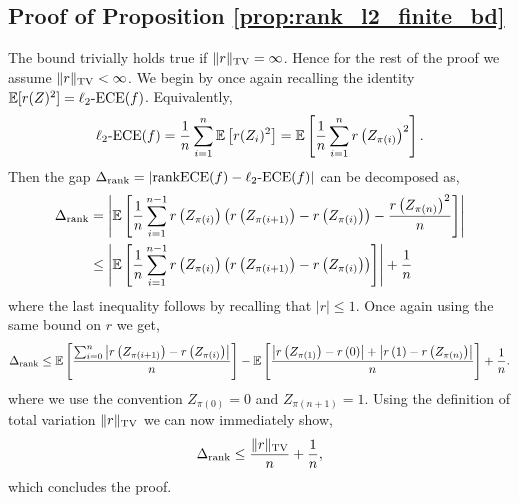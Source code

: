 \documentclass[11pt]{article}
\numberwithin{equation}{section}
\theoremstyle{definition}
\newcommand{\E}{\mathbb{E}}
\newcommand{\ECE}{\mathrm{ECE}}
\newcommand{\lECE}{\ell_2\textnormal{-}\ECE}
\newcommand{\rankECE}{\mathrm{rankECE}}
\begin{document}
\subsection{Proof of Proposition \ref{prop:rank_l2_finite_bd}}\label{sec:proofof_prop_rank_l2_finite_bd}
The bound trivially holds true if $\|r\|_{\textnormal{TV}} = \infty$. Hence for the rest of the proof we assume $\|r\|_{\textnormal{TV}}<\infty$. We begin by once again recalling the identity $\E[r(Z)^2] = \lECE(f)$. Equivalently,
\begin{align*}
    \lECE(f) = \frac{1}{n}\sum_{i=1}^{n}\E\left[r(Z_i)^2\right] = \E\left[\frac{1}{n}\sum_{i=1}^{n}r\left(Z_{\pi(i)}\right)^2\right].
\end{align*}
Then the gap  $\Delta_{\textnormal{rank}} = \left|\rankECE(f) - \lECE(f)\right|$ can be decomposed as,
\begin{align*}
    \Delta_{\textnormal{rank}} 
    & = \left|\E\left[\frac{1}{n}\sum_{i=1}^{n-1}r\left(Z_{\pi(i)}\right)\left(r\left(Z_{\pi(i+1)}\right) - r\left(Z_{\pi(i)}\right)\right) - \frac{r\left(Z_{\pi(n)}\right)^2}{n}\right]\right|\\
    & \leq \left|\E\left[\frac{1}{n}\sum_{i=1}^{n-1}r\left(Z_{\pi(i)}\right)\left(r\left(Z_{\pi(i+1)}\right) - r\left(Z_{\pi(i)}\right)\right)\right]\right| + \frac{1}{n}
\end{align*}
where the last inequality follows by recalling that $|r|\leq 1$. Once again using the same bound on $r$ we get,
\begin{align*}
    \Delta_{\textnormal{rank}} \leq \E\left[\frac{\sum_{i=0}^{n}\left|r\left(Z_{\pi(i+1)}\right) - r\left(Z_{\pi(i)}\right)\right|}{n}\right] -\E\left[\frac{\left|r\left(Z_{\pi(1)}\right) - r\left(0\right)\right| + \left|r\left(1\right) - r\left(Z_{\pi(n)}\right)\right|}{n}\right] + \frac{1}{n}.
\end{align*}
where we use the convention $Z_{\pi(0)} = 0$ and $Z_{\pi(n+1)} = 1$. Using the definition of total variation $\|r\|_{\textnormal{TV}}$ we can now immediately show,
\begin{align*}
    \Delta_{\textnormal{rank}}\leq \frac{\|r\|_{\textnormal{TV}}}{n} + \frac{1}{n},
\end{align*}
which concludes the proof.
\end{document}
